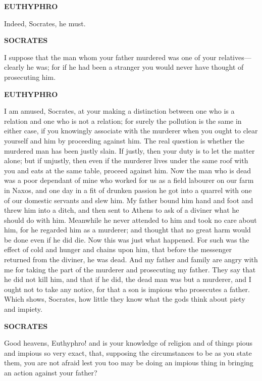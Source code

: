 \documentclass[11pt,letter]{article}
\begin{document}
\par \textbf{EUTHYPHRO}
\par   Indeed, Socrates, he must.

\par \textbf{SOCRATES}
\par   I suppose that the man whom your father murdered was one of your relatives—clearly he was; for if he had been a stranger you would never have thought of prosecuting him.

\par \textbf{EUTHYPHRO}
\par   I am amused, Socrates, at your making a distinction between one who is a relation and one who is not a relation; for surely the pollution is the same in either case, if you knowingly associate with the murderer when you ought to clear yourself and him by proceeding against him. The real question is whether the murdered man has been justly slain. If justly, then your duty is to let the matter alone; but if unjustly, then even if the murderer lives under the same roof with you and eats at the same table, proceed against him. Now the man who is dead was a poor dependant of mine who worked for us as a field labourer on our farm in Naxos, and one day in a fit of drunken passion he got into a quarrel with one of our domestic servants and slew him. My father bound him hand and foot and threw him into a ditch, and then sent to Athens to ask of a diviner what he should do with him. Meanwhile he never attended to him and took no care about him, for he regarded him as a murderer; and thought that no great harm would be done even if he did die. Now this was just what happened. For such was the effect of cold and hunger and chains upon him, that before the messenger returned from the diviner, he was dead. And my father and family are angry with me for taking the part of the murderer and prosecuting my father. They say that he did not kill him, and that if he did, the dead man was but a murderer, and I ought not to take any notice, for that a son is impious who prosecutes a father. Which shows, Socrates, how little they know what the gods think about piety and impiety.

\par \textbf{SOCRATES}
\par   Good heavens, Euthyphro! and is your knowledge of religion and of things pious and impious so very exact, that, supposing the circumstances to be as you state them, you are not afraid lest you too may be doing an impious thing in bringing an action against your father?
\end{document}
